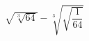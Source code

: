 \begin{ex}[type=calculate]
	\begin{condition}
		\( \sqrt{\sqrt[3]{64}}-\sqrt[3]{\sqrt{\dfrac{1}{64}}} \)
	\end{condition}
\end{ex}